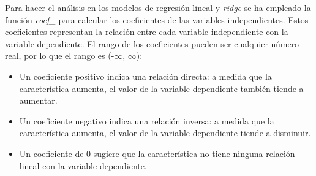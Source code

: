 \documentclass[12pt,a4paper]{article}
\begin{document}
Para hacer el análisis en los modelos de regresión lineal y \textit{ridge} se ha empleado la función \textit{coef\_} para calcular los coeficientes de las variables independientes. Estos coeficientes representan la relación entre cada variable independiente con la variable dependiente. El rango de los coeficientes pueden ser cualquier número real, por lo que el rango es (-$\infty$, $\infty$):
\begin{itemize}
	\item Un coeficiente positivo indica una relación directa: a medida que la característica aumenta, el valor de la variable dependiente también tiende a aumentar.
	\item Un coeficiente negativo indica una relación inversa: a medida que la característica aumenta, el valor de la variable dependiente tiende a disminuir.
	\item Un coeficiente de 0 sugiere que la característica no tiene ninguna relación lineal con la variable dependiente.
\end{itemize}
\end{document}

